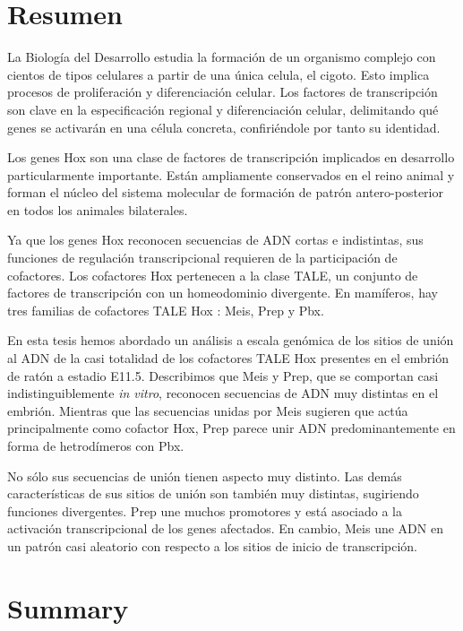 \chapter{Resumen}

La Biología del Desarrollo estudia la formación de un organismo complejo con cientos de tipos celulares a partir de una única celula, el cigoto. Esto implica procesos de proliferación y diferenciación celular. Los factores de transcripción son clave en la especificación regional y diferenciación celular, delimitando qué genes se activarán en una célula concreta, confiriéndole por tanto su identidad. 

Los genes Hox son una clase de factores de transcripción implicados en desarrollo particularmente importante. Están ampliamente conservados en el reino animal y forman el núcleo del sistema molecular de formación de patrón antero-posterior en todos los animales bilaterales. 

Ya que los genes Hox reconocen secuencias de ADN cortas e indistintas, sus funciones de regulación transcripcional requieren de la participación de cofactores. Los cofactores Hox pertenecen a la clase TALE, un conjunto de factores de transcripción con un homeodominio divergente. En mamíferos, hay tres familias de cofactores TALE Hox : Meis, Prep y Pbx. 

En esta tesis hemos abordado un análisis a escala genómica de los sitios de unión al ADN de la casi totalidad de los cofactores TALE Hox presentes en el embrión de ratón a estadio E11.5. Describimos que Meis y Prep, que se comportan casi indistinguiblemente \textit{in vitro}, reconocen secuencias de ADN muy distintas en el embrión. Mientras que las secuencias unidas por Meis sugieren que actúa principalmente como cofactor Hox, Prep parece unir ADN predominantemente en forma de hetrodímeros con Pbx. 

No sólo sus secuencias de unión tienen aspecto muy distinto. Las demás características de sus sitios de unión son también muy distintas, sugiriendo funciones divergentes. Prep une muchos promotores y está asociado a la activación transcripcional de los genes afectados. En cambio, Meis une ADN en un patrón casi aleatorio con respecto a los sitios de inicio de transcripción. 






\chapter{Summary}

